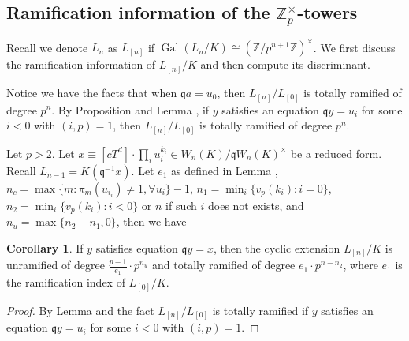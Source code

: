 \documentclass{proc-l}
\theoremstyle{definition}
\newtheorem{corollary}[theorem]{Corollary}
\theoremstyle{remark}
\numberwithin{equation}{section}
\DeclareMathOperator{\Gal}{Gal}
\begin{document}
\subsection{Ramification information of the $\mathbb Z_p^\times$-towers}\label{5.3}
Recall we denote $L_n$ as $L_{[n]}$ if $\Gal(L_n/K)\cong(\mathbb Z/p^{n+1}\mathbb Z)^\times$. We first discuss the ramification information of $L_{[n]}/K$ and then compute its discriminant. 

Notice we have the facts that when $
\mathfrak q a=u_0$, then $L_{[n]}/L_{[0]}$ is totally ramified of degree $p^{n}$. By Proposition \boxed{\ref{39}} and Lemma \boxed{\ref{4.9}},  if $y$ satisfies an equation $\mathfrak qy=u_i$ for some $i<0$ with $(i,p)=1$, then $L_{[n]}/L_{[0]}$ is totally ramified of degree $p^{n}$.

Let $p>2$. Let $x\equiv [cT^d]\cdot\prod_{i}u_{i}^{k_i}\in W_n(K)/\mathfrak qW_n(K)^{\times}$ be a reduced form. Recall $L_{n-1}=K(\mathfrak q^{-1}x)$. Let $e_1$ as defined in Lemma \boxed{\ref{4.3}}, 
$n_c=\max\{m:\pi_{m}(u_{i_i})\neq 1,\forall u_{i}\}-1$, 
$n_1=\min_i\{v_p(k_i):i=0\}$,
$n_2=\min_i\{v_p(k_i):i<0\}$ or $n$ if such $i$ does not exists, and $n_u=\max\{n_2-n_1,0\}$, then we have 
\begin{corollary}
    If $y$ satisfies equation $\mathfrak qy=x$, then the cyclic extension $L_{[n]}/K$ is unramified of degree $\frac{p-1}{e_1}\cdot p^{n_u}$ and totally ramified of degree $e_1\cdot p^{n-n_2}$, where $e_1$ is the ramification index of $L_{[0]}/K$. %
\end{corollary}
\begin{proof}
    By Lemma \boxed{\ref{4.3}} and the fact $L_{[n]}/L_{[0]}$ is totally ramified if $y$ satisfies an equation $\mathfrak qy=u_i$ for some $i<0$ with $(i,p)=1$.
\end{proof}
\end{document}
